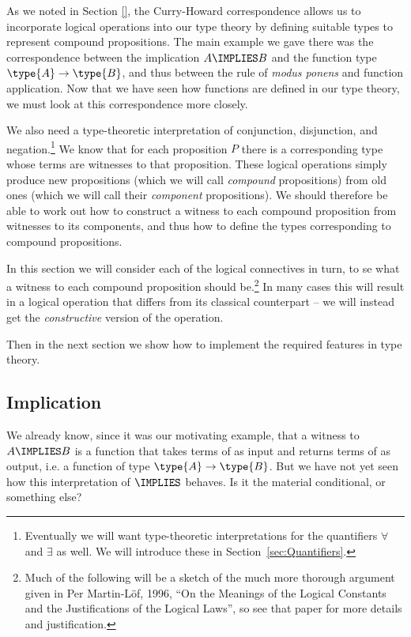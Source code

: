 As we noted in Section \ref{}, the Curry-Howard correspondence allows us to incorporate logical operations into our type theory by defining suitable types to represent compound propositions.  The main example we gave there was the correspondence between 
the implication ${A \IMPLIES B}$ and the function type $\type{A}\to\type{B}$, and thus between the rule of \emph{modus ponens} and function application.  Now that we have seen how functions are defined in our type theory, we must look at this correspondence more closely.

We also need a type-theoretic interpretation of conjunction, disjunction, and negation.\footnote{
Eventually we will want type-theoretic interpretations for the quantifiers $\forall$ and $\exists$ as well.  We will introduce these in Section~\ref{sec:Quantifiers}.
}
We know that for each proposition $P$ there is a corresponding type  whose terms are witnesses to that proposition.  These logical operations simply produce new propositions (which we will call \emph{compound} propositions) from old ones (which we will call their \emph{component} propositions).
We should therefore be able to work out 
how to construct a witness to each compound proposition from witnesses to its components, and thus how to define the types corresponding to compound propositions.

In this section we will consider each of the logical connectives in turn, to se what a witness to each compound proposition should be.\footnote{
Much of the following will be a sketch of the much more thorough argument given in Per Martin-L\"{o}f, 1996, ``On the Meanings of the Logical Constants and the Justifications of the Logical Laws'', so see that paper for more details and justification.
}
In many cases this will result in a logical operation that differs from its classical counterpart -- we will instead get the \emph{constructive} version of the operation.

Then 
in the next section we 
show how to implement the required features in type theory.


\subsection{Implication}
\label{sec:Logic-Implication}

We already know, since it was our motivating example, that a witness to $A \IMPLIES B$ is a function that takes terms of  as input and returns terms of  as output, i.e. a function of type $\type{A} \to \type{B}$.  But we have not yet seen how this interpretation of $\IMPLIES$ behaves.  Is it the material conditional, or something else?

